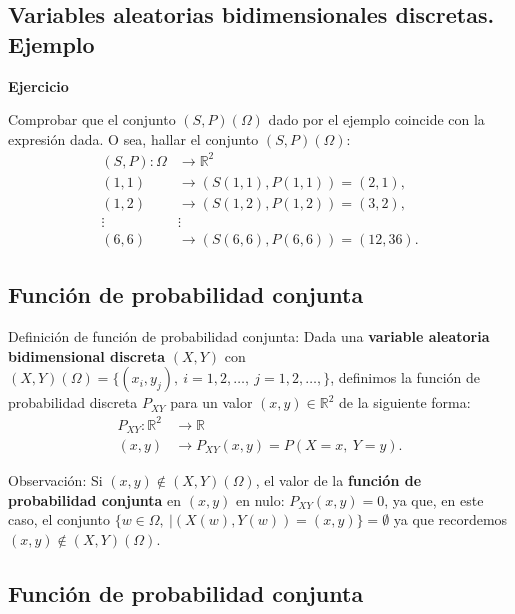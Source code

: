 \documentclass[]{book}
\begin{document}
\hypertarget{variables-aleatorias-bidimensionales-discretas.-ejemplo-1}{%
\subsection{Variables aleatorias bidimensionales discretas. Ejemplo}\label{variables-aleatorias-bidimensionales-discretas.-ejemplo-1}}

\textbf{Ejercicio}

Comprobar que el conjunto \((S,P)(\Omega)\) dado por el ejemplo coincide con la expresión dada.
O sea, hallar el conjunto \((S,P)(\Omega)\):
\[
\begin{array}{rl}
(S,P): \Omega & \longrightarrow \mathbb{R}^2\\
(1,1) & \longrightarrow (S(1,1),P(1,1))=(2,1),\\
(1,2) & \longrightarrow (S(1,2),P(1,2))=(3,2),\\
\vdots & \vdots \\
(6,6) & \longrightarrow (S(6,6),P(6,6))=(12,36).
\end{array}
\]

\hypertarget{funciuxf3n-de-probabilidad-conjunta}{%
\subsection{Función de probabilidad conjunta}\label{funciuxf3n-de-probabilidad-conjunta}}

Definición de función de probabilidad conjunta:
Dada una \textbf{variable aleatoria bidimensional discreta} \((X,Y)\) con \((X,Y)(\Omega)=\{(x_i,y_j),\ i=1,2,\ldots,\ j=1,2,\ldots,\}\), definimos la función de probabilidad discreta \(P_{XY}\) para un valor \((x,y)\in\mathbb{R}^2\) de la siguiente forma:
\[
\begin{array}{rl}
P_{XY}: \mathbb{R}^2 & \longrightarrow \mathbb{R}\\
(x,y) & \longrightarrow P_{XY}(x,y)=P(X= x,\ Y= y).
\end{array}
\]

Observación:
Si \((x,y)\not\in (X,Y)(\Omega)\), el valor de la \textbf{función de probabilidad conjunta} en \((x,y)\) en nulo: \(P_{XY}(x,y)=0\), ya que, en este caso, el conjunto \(\{w\in\Omega,\ | (X(w),Y(w))=(x,y)\}=\emptyset\) ya que recordemos \((x,y)\not\in (X,Y)(\Omega)\).

\hypertarget{funciuxf3n-de-probabilidad-conjunta-1}{%
\subsection{Función de probabilidad conjunta}\label{funciuxf3n-de-probabilidad-conjunta-1}}
\end{document}
